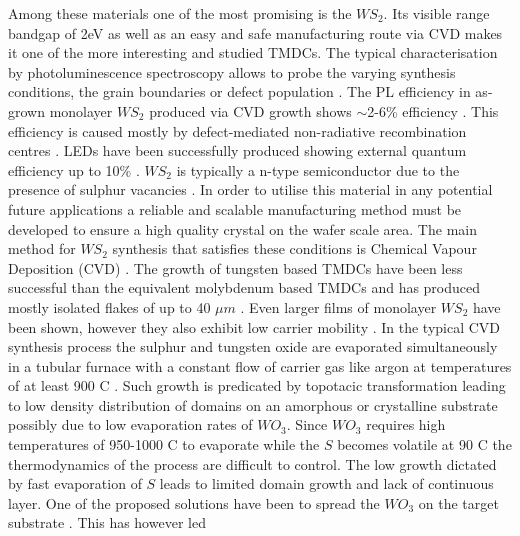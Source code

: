 Among these materials one of the most promising is the $WS_2$. Its visible range bandgap of 2eV as well as an easy and safe manufacturing route via CVD makes it one of the more interesting and studied TMDCs. The typical characterisation by photoluminescence spectroscopy allows to probe the varying synthesis conditions, the grain boundaries or defect population \cite{ExtraordinaryRoomTemperaturePhotoluminescenceInTriangularWS2Monolayers} \cite{doi:10.1021/nn4046002} \cite{Li2015} \cite{Rong2014}. The PL efficiency in as-grown monolayer $WS_2$ produced via CVD growth shows {$\sim$}2-6\% efficiency \cite{doi:10.1021/nn4046002}\cite{Yuan2015} \cite{doi:10.1021/nn403682r}. This efficiency is caused mostly by defect-mediated non-radiative recombination centres \cite{Amani2015}. LEDs have been successfully produced \cite{doi:10.1021/nl500171v} showing external quantum efficiency up to 10\% \cite{Zeng2016}\cite{Withers2015}. $WS_2$ is typically a n-type semiconductor due to the presence of sulphur vacancies \cite{ExtraordinaryRoomTemperaturePhotoluminescenceInTriangularWS2Monolayers}\cite{doi:10.1021/nn5059908}\cite{Iqbal2015}. In order to utilise this material in any potential future applications a reliable and scalable manufacturing method must be developed to ensure a high quality crystal on the wafer scale area. The main method for $WS_2$ synthesis that satisfies these conditions is Chemical Vapour Deposition (CVD) \cite{Hofmann1988}. The growth of tungsten based TMDCs have been less successful than the equivalent molybdenum based TMDCs and has produced mostly isolated flakes of up to 40 $\mu m$ \cite{ExtraordinaryRoomTemperaturePhotoluminescenceInTriangularWS2Monolayers} \cite{doi:10.1021/nn403454e} \cite{Rong2014} \cite{doi:10.1021/nn400971k}\cite{doi:10.1021/acsnano.5b01480}\cite{Fu2015}\cite{Lee2013}. Even larger films of monolayer $WS_2$ have been shown, however they also exhibit low carrier mobility \cite{Kang2015}\cite{Gao2015}. In the typical CVD synthesis process the sulphur and tungsten oxide are evaporated simultaneously in a tubular furnace with a constant flow of carrier gas like argon at temperatures of at least 900 {\degree}C \cite{ExtraordinaryRoomTemperaturePhotoluminescenceInTriangularWS2Monolayers}\cite{doi:10.1021/nn403454e}\cite{Rong2014}\cite{doi:10.1021/nn400971k}\cite{doi:10.1021/acsnano.5b01480}\cite{Fu2015}\cite{Lee2013}. Such growth is predicated by topotacic transformation leading to low density distribution of domains on an amorphous \cite{ExtraordinaryRoomTemperaturePhotoluminescenceInTriangularWS2Monolayers}\cite{doi:10.1021/nn403454e}\cite{doi:10.1021/nn400971k}\cite{Fu2015}\cite{Lee2013} or crystalline substrate \cite{Rong2014}\cite{doi:10.1021/acsnano.5b01480}\cite{doi:10.1021/nn503093k} possibly due to low evaporation rates of $WO_3$. Since $WO_3$ requires high temperatures of 950-1000 {\degree}C to evaporate while the $S$ becomes volatile at 90 {\degree}C the thermodynamics of the process are difficult to control. The low growth dictated by fast evaporation of $S$ leads to limited domain growth and lack of continuous layer. One of the proposed solutions have been to spread the $WO_3$ on the target substrate \cite{doi:10.1021/nn4046002}\cite{Li2015}\cite{Gao2015}\cite{Cong2013}\cite{Yun2015}\cite{Gong2015}\cite{Gong2014}. This has however led 